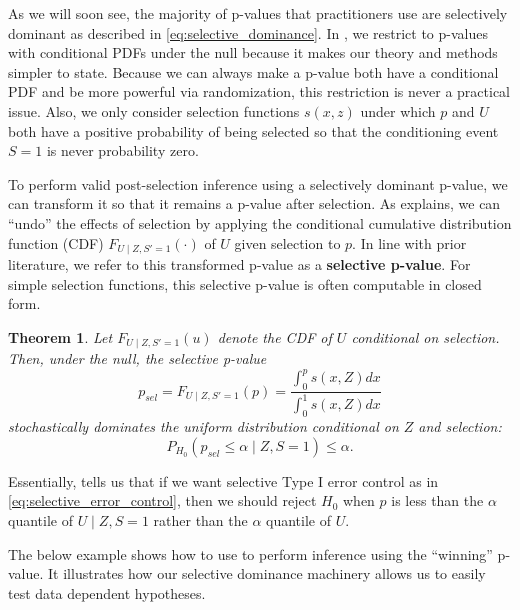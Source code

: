\documentclass{article}
\newtheorem{theorem}{Theorem}
\begin{document}
As we will soon see, the majority of p-values that practitioners use are selectively dominant as described in \eqref{eq:selective_dominance}. In , we restrict to p-values with conditional PDFs under the null because it makes our theory and methods simpler to state. Because we can always make a p-value both have a conditional PDF and be more powerful via randomization, this restriction is never a practical issue. Also, we only consider selection functions $s(x, z)$ under which $p$ and $U$ both have a positive probability of being selected so that the conditioning event $S = 1$ is never probability zero. 

To perform valid post-selection inference using a selectively dominant p-value, we can transform it so that it remains a p-value after selection. As  explains, we can ``undo'' the effects of selection by applying the conditional cumulative distribution function (CDF) $F_{U \mid Z, S' = 1}(\cdot)$ of $U$ given selection to $p$. In line with prior literature, we refer to this transformed p-value as a \textbf{selective p-value}. For simple selection functions, this selective p-value is often computable in closed form. 

\begin{theorem}
    \label{thm:adjustment}
    Let  $F_{U \mid Z, S '= 1}(u)$ denote the CDF of $U$ conditional on selection. Then, under the null, the selective p-value 
    \begin{equation}
    \label{eq:adjustment}
        p_{sel} = F_{U \mid Z, S' = 1}(p) = \frac{\int_0^p s(x, Z) dx}{\int_0^1 s(x, Z) dx}
    \end{equation}
    stochastically dominates the uniform distribution conditional on $Z$ and selection:
    \begin{equation}
        P_{H_0}(p_{sel} \leq \alpha \mid Z, S= 1) \leq \alpha. 
    \end{equation}
\end{theorem}

Essentially,  tells us that if we want selective Type I error control as in \eqref{eq:selective_error_control}, then we should reject $H_0$ when $p$ is less than the $\alpha$ quantile of $U \mid Z, S = 1$ rather than the $\alpha$ quantile of $U$. 

The below example shows how to use  to perform inference using the ``winning'' p-value. It illustrates how our selective dominance machinery allows us to easily test data dependent hypotheses. 
\end{document}

